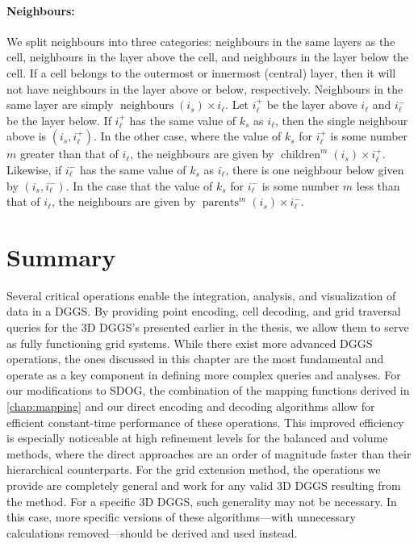 \paragraph{Neighbours:}
We split neighbours into three categories: neighbours in the same layers as the cell, neighbours in the layer above the cell, and neighbours in the layer below the cell.
If a cell belongs to the outermost or innermost (central) layer, then it will not have neighbours in the layer above or below, respectively.
Neighbours in the same layer are simply $\operatorname{neighbours}(i_s) \times i_\ell$.
Let $i_\ell^+$ be the layer above $i_\ell$ and $i_\ell^-$ be the layer below.
If $i_\ell^+$ has the same value of $k_s$ as $i_\ell$, then the single neighbour above is $(i_s, i_\ell^+)$.
In the other case, where the value of $k_s$ for $i_\ell^+$ is some number $m$ greater than that of $i_\ell$, the neighbours are given by $\operatorname{children}^m(i_s) \times i_\ell^+$.
Likewise, if $i_\ell^-$ has the same value of $k_s$ as $i_\ell$, there is one neighbour below given by $(i_s, i_\ell^-)$.
In the case that the value of $k_s$ for $i_\ell^-$ is some number $m$ less than that of $i_\ell$, the neighbours are given by $\operatorname{parents}^m(i_s) \times i_\ell^-$.


\section{Summary}
Several critical operations enable the integration, analysis, and visualization of data in a DGGS.
By providing point encoding, cell decoding, and grid traversal queries for the 3D DGGS's presented earlier in the thesis, we allow them to serve as fully functioning grid systems.
While there exist more advanced DGGS operations, the ones discussed in this chapter are the most fundamental and operate as a key component in defining more complex queries and analyses.
For our modifications to SDOG, the combination of the mapping functions derived in \cref{chap:mapping} and our direct encoding and decoding algorithms allow for efficient constant-time performance of these operations.
This improved efficiency is especially noticeable at high refinement levels for the balanced and volume methods, where the direct approaches are an order of magnitude faster than their hierarchical counterparts.
For the grid extension method, the operations we provide are completely general and work for any valid 3D DGGS resulting from the method.
For a specific 3D DGGS, such generality may not be necessary.
In this case, more specific versions of these algorithms---with unnecessary calculations removed---should be derived and used instead.
